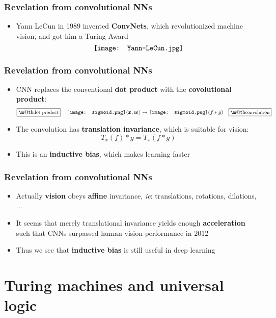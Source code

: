 \documentclass[17pt]{beamer}
\makeatletter
\newcommand{\vect}[1]{\boldsymbol{#1}}
\newcommand*\sigmoid{\vcenter{\hbox{\texttt{[image: sigmoid.png]}}}}
\renewcommand{\boxed}[1]{\fbox{\m@th$\displaystyle\scalebox{0.9}{#1}$} \,}
\makeatother
\begin{document}
\begin{frame}
\frametitle{Revelation from convolutional NNs}
\begin{itemize}
	\item Yann LeCun in 1989 invented \textbf{ConvNets}, which revolutionized machine vision, and got him a Turing Award
	\begin{equation}
	\nonumber
	\vcenter{\hbox{\texttt{[image: Yann-LeCun.jpg]}}}
	\end{equation}
\end{itemize}
\end{frame}

\begin{frame}
\frametitle{Revelation from convolutional NNs}
\fontsize{15}{15}\selectfont
\begin{itemize}
	\item CNN replaces the conventional \textbf{dot product} with the \textbf{covolutional product}:
	\begin{equation}
	\boxed{\mbox{dot product}} \quad \sigmoid \langle \vect{x}, \vect{w} \rangle \rightsquigarrow \sigmoid( f * g ) \quad \boxed{\mbox{convolution}}
	\end{equation}
	\item The convolution has {\color{red}\textbf{translation invariance}}, which is suitable for vision:
	\begin{equation}
	T_x(f) * g = T_x( f * g )
	\end{equation}
	\item This is an \textbf{inductive bias}, which makes learning faster
\end{itemize}
\end{frame}

\begin{frame}
\frametitle{Revelation from convolutional NNs}
\begin{itemize}
	\item Actually \textbf{vision} obeys \textbf{affine} invariance, \textit{ie}: translations, rotations, dilations, ...
	\item It seems that merely translational invariance yields enough \textbf{acceleration} such that CNNs surpassed human vision performance in 2012
	\item Thus we see that \textbf{inductive bias} is still useful in deep learning
\end{itemize}
\end{frame}

\section{Turing machines and universal logic}
\frame{\sectionpage}
\end{document}
